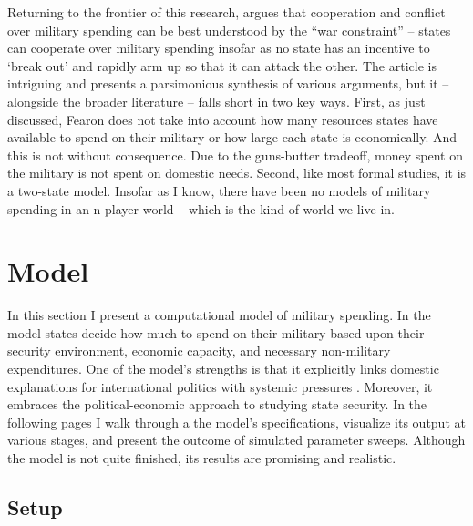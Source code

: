 \documentclass[12pt]{article}
\begin{document}
Returning to the frontier of this research, \citet{fearon2018} argues that cooperation and conflict over military spending can be best understood by the ``war constraint'' -- states can cooperate over military spending insofar as no state has an incentive to `break out' and rapidly arm up so that it can attack the other. The article is intriguing and presents a parsimonious synthesis of various arguments, but it -- alongside the broader literature -- falls short in two key ways. First, as just discussed, Fearon does not take into account how many resources states have available to spend on their military or how large each state is economically. And this is not without consequence. Due to the guns-butter tradeoff, money spent on the military is not spent on domestic needs. Second, like most formal studies, it is a two-state model. Insofar as I know, there have been no models of military spending in an n-player world -- which is the kind of world we live in.

\section{Model}

In this section I present a computational model of military spending. In the model states decide how much to spend on their military based upon their security environment, economic capacity, and necessary non-military expenditures. One of the model's strengths is that it explicitly links domestic explanations for international politics \citep[e.g.,][]{milner2015sailing, weeks2014dictators} with systemic pressures \citep[e.g.,][]{braumoeller2008, waltz1979}. Moreover, it embraces the political-economic approach to studying state security. \citep{poast2019beyond} In the following pages I walk through a the model's specifications, visualize its output at various stages, and present the outcome of simulated parameter sweeps. Although the model is not quite finished, its results are promising and realistic.

\subsection{Setup}\label{Setup}
\end{document}
